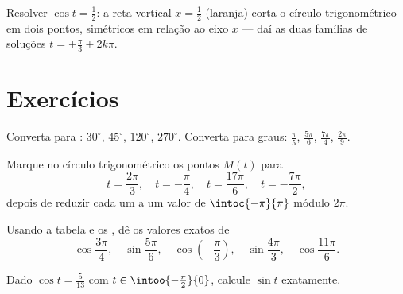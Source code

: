 \begin{omfigure}

{\small Resolver $\cos t = \frac12$: a reta vertical $x = \frac12$
(laranja) corta o círculo trigonométrico em dois pontos, simétricos em
relação ao eixo $x$ --- daí as duas famílias de soluções
$t = \pm\frac\pi3 + 2k\pi$.}
\end{omfigure}

\section{Exercícios}

\begin{exercise}[$\star$]\label{exo:g11:trigo:1}
Converta para : $30^\circ$, $45^\circ$, $120^\circ$,
$270^\circ$. Converta para graus: $\frac{\pi}{5}$, $\frac{5\pi}{6}$,
$\frac{7\pi}{4}$, $\frac{2\pi}{9}$.
\end{exercise}

\begin{exercise}[$\star$]\label{exo:g11:trigo:2}
Marque no círculo trigonométrico os pontos $M(t)$ para
\[
t = \frac{2\pi}{3},\quad
t = -\frac{\pi}{4},\quad
t = \frac{17\pi}{6},\quad
t = -\frac{7\pi}{2},
\]
depois de reduzir cada um a um valor de $\intoc{-\pi}{\pi}$ módulo
$2\pi$.
\end{exercise}

\begin{exercise}[$\star$]\label{exo:g11:trigo:3}
Usando a tabela e os , dê os valores exatos de
\[
\cos\frac{3\pi}{4}, \quad
\sin\frac{5\pi}{6}, \quad
\cos\left(-\frac{\pi}{3}\right), \quad
\sin\frac{4\pi}{3}, \quad
\cos\frac{11\pi}{6} .
\]
\end{exercise}

\begin{exercise}[$\star$]\label{exo:g11:trigo:4}
Dado $\cos t = \frac{5}{13}$ com $t \in \intoo{-\frac\pi2}{0}$, calcule
$\sin t$ exatamente.
\end{exercise}

